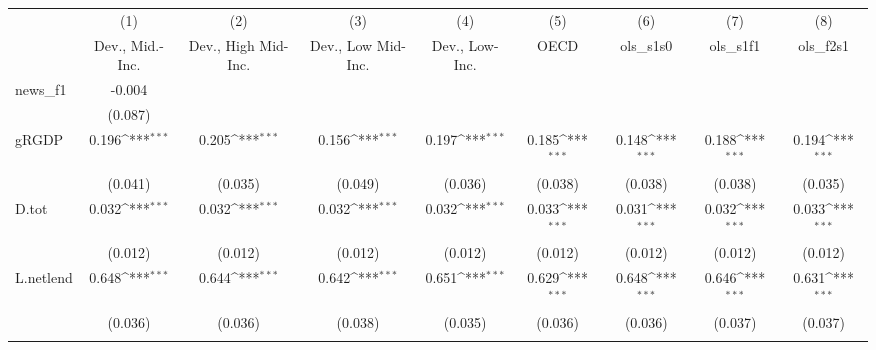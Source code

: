{
\def\sym#1{\ifmmode^{#1}\else\(^{#1}\)\fi}
\begin{tabular}{l*{8}{c}}
\toprule
            &\multicolumn{1}{c}{(1)}&\multicolumn{1}{c}{(2)}&\multicolumn{1}{c}{(3)}&\multicolumn{1}{c}{(4)}&\multicolumn{1}{c}{(5)}&\multicolumn{1}{c}{(6)}&\multicolumn{1}{c}{(7)}&\multicolumn{1}{c}{(8)}\\
            &\multicolumn{1}{c}{Dev., Mid.-Inc.}&\multicolumn{1}{c}{Dev., High Mid-Inc.}&\multicolumn{1}{c}{Dev., Low Mid-Inc.}&\multicolumn{1}{c}{Dev., Low-Inc.}&\multicolumn{1}{c}{OECD}&\multicolumn{1}{c}{ols\_s1s0}&\multicolumn{1}{c}{ols\_s1f1}&\multicolumn{1}{c}{ols\_f2s1}\\
\midrule
news\_f1     &      -0.004         &                     &                     &                     &                     &                     &                     &                     \\
            &     (0.087)         &                     &                     &                     &                     &                     &                     &                     \\
\addlinespace
gRGDP       &       0.196\sym{***}&       0.205\sym{***}&       0.156\sym{***}&       0.197\sym{***}&       0.185\sym{***}&       0.148\sym{***}&       0.188\sym{***}&       0.194\sym{***}\\
            &     (0.041)         &     (0.035)         &     (0.049)         &     (0.036)         &     (0.038)         &     (0.038)         &     (0.038)         &     (0.035)         \\
\addlinespace
D.tot       &       0.032\sym{***}&       0.032\sym{***}&       0.032\sym{***}&       0.032\sym{***}&       0.033\sym{***}&       0.031\sym{***}&       0.032\sym{***}&       0.033\sym{***}\\
            &     (0.012)         &     (0.012)         &     (0.012)         &     (0.012)         &     (0.012)         &     (0.012)         &     (0.012)         &     (0.012)         \\
\addlinespace
L.netlend   &       0.648\sym{***}&       0.644\sym{***}&       0.642\sym{***}&       0.651\sym{***}&       0.629\sym{***}&       0.648\sym{***}&       0.646\sym{***}&       0.631\sym{***}\\
            &     (0.036)         &     (0.036)         &     (0.038)         &     (0.035)         &     (0.036)         &     (0.036)         &     (0.037)         &     (0.037)         \\
\addlinespace

\end{tabular}}
